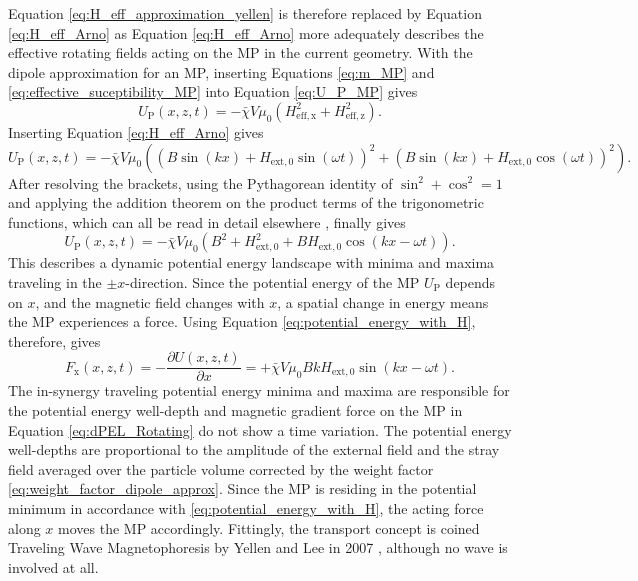 Equation \ref{eq:H_eff_approximation_yellen} is therefore replaced by Equation \ref{eq:H_eff_Arno} as Equation \ref{eq:H_eff_Arno} more adequately describes the effective rotating fields acting on the \ac{MP} in the current geometry.   
With the dipole approximation for an \ac{MP}, inserting Equations \ref{eq:m_MP} and \ref{eq:effective_suceptibility_MP} into Equation \ref{eq:U_P_MP} gives \cite{Ehresmann2026}
\begin{equation}\label{eq:potential_energy_with_H}
    U_\mathrm{P}(x,z,t) = -\bar{\chi}V\mu_0\left( H^2_\mathrm{eff, x} + H^2_\mathrm{eff, z} \right).
\end{equation}
Inserting Equation \ref{eq:H_eff_Arno} gives\cite{Ehresmann2026}
\begin{equation}
            U_\mathrm{P}(x,z,t) = -\bar{\chi}V\mu_0\left( \left( B \sin(kx)+H_\mathrm{ext,0} \sin(\omega t)\right)^2 + \left(B \sin(kx)+H_\mathrm{ext,0} \cos(\omega t)\right)^2\right).
\end{equation}
After resolving the brackets, using the Pythagorean identity of $\sin^2+\cos^2 = 1$ and applying the addition theorem on the product terms of the trigonometric functions, which can all be read in detail elsewhere \cite{Ehresmann2026}, finally gives
\begin{equation}\label{eq:dPEL_Rotating}
     U_\mathrm{P}(x,z,t) = -\bar{\chi}V\mu_0 \left(B^2 + H^2_\mathrm{ext,0}+BH_\mathrm{ext,0}\cos(kx-\omega t)\right).
\end{equation}
This describes a dynamic potential energy landscape with minima and maxima traveling in the $\pm x$-direction.
Since the potential energy of the \ac{MP} $U_\mathrm{P}$ depends on $x$, and the magnetic field changes with $x$, a spatial change in energy means the \ac{MP} experiences a force.
Using Equation \ref{eq:potential_energy_with_H}, therefore, gives 
\begin{equation}
    F_\mathrm{x}(x,z,t) = -\frac{\partial U(x,z,t)}{\partial x} = +\bar{\chi}V\mu_0 BkH_\mathrm{ext,0}\sin(kx-\omega t). 
\end{equation}
The in-synergy traveling potential energy minima and maxima are responsible for the potential energy well-depth and magnetic gradient force on the \ac{MP} in Equation \ref{eq:dPEL_Rotating} do not show a time variation.
The potential energy well-depths are proportional to the amplitude of the external field and the stray field averaged over the particle volume corrected by the weight factor \ref{eq:weight_factor_dipole_approx}. 
Since the \ac{MP} is residing in the potential minimum in accordance with \ref{eq:potential_energy_with_H}, the acting force along $x$ moves the \ac{MP} accordingly. 
Fittingly, the transport concept is coined Traveling Wave Magnetophoresis by Yellen and Lee in 2007 \cite{Yellen2007}, although no wave is involved at all.

